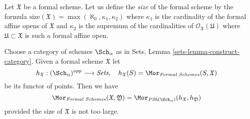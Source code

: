 \medskip\noindent
Let $\mathfrak X$ be a formal scheme. Let us define the {\it size}
of the formal scheme by the formula
$\text{size}(\mathfrak X) = \max(\aleph_0, \kappa_1, \kappa_2)$
where $\kappa_1$ is the cardinality of the formal affine opens of
$\mathfrak X$ and $\kappa_2$ is the supremum of the cardinalities
of $\mathcal{O}_\mathfrak X(\mathfrak U)$ where
$\mathfrak U \subset \mathfrak X$ is such a formal affine open.

\begin{lemma}
\label{lemma-fully-faithful}
Choose a category of schemes $\Sch_\alpha$
as in Sets, Lemma \ref{sets-lemma-construct-category}.
Given a formal scheme $\mathfrak X$ let
$$
h_\mathfrak X : (\Sch_\alpha)^{opp} \longrightarrow \textit{Sets},\quad
h_\mathfrak X(S) = \Mor_{\textit{Formal Schemes}}(S, \mathfrak X)
$$
be its functor of points. Then we have
$$
\Mor_{\textit{Formal Schemes}}(\mathfrak X, \mathfrak Y) =
\Mor_{\textit{PSh}(\Sch_\alpha)}(h_\mathfrak X, h_\mathfrak Y)
$$
provided the size of $\mathfrak X$ is not too large.
\end{lemma}


